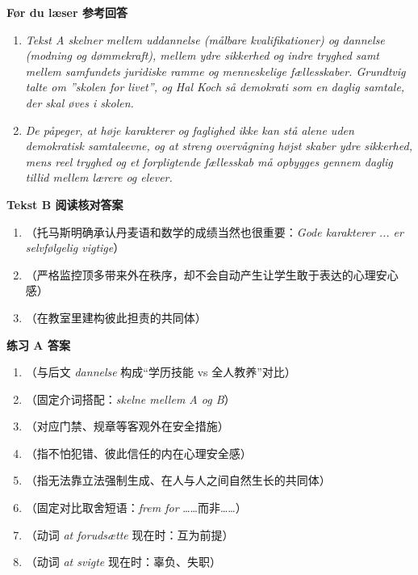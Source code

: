 \begin{answerbox}
\textbf{Før du læser 参考回答}
\begin{enumerate}
  \item \textit{Tekst A skelner mellem uddannelse (målbare kvalifikationer) og dannelse (modning og dømmekraft), mellem ydre sikkerhed og indre tryghed samt mellem samfundets juridiske ramme og menneskelige fællesskaber. Grundtvig talte om ”skolen for livet”, og Hal Koch så demokrati som en daglig samtale, der skal øves i skolen.}
  \item \textit{De påpeger, at høje karakterer og faglighed ikke kan stå alene uden demokratisk samtaleevne, og at streng overvågning højst skaber ydre sikkerhed, mens reel tryghed og et forpligtende fællesskab må opbygges gennem daglig tillid mellem lærere og elever.}
\end{enumerate}

\textbf{Tekst B 阅读核对答案}
\begin{enumerate}
  \item {}（托马斯明确承认丹麦语和数学的成绩当然也很重要：\textit{Gode karakterer ... er selvfølgelig vigtige}）
  \item {}（严格监控顶多带来外在秩序，却不会自动产生让学生敢于表达的心理安心感）
  \item {}（在教室里建构彼此担责的共同体）
\end{enumerate}

\textbf{练习 A 答案}
\begin{enumerate}
  \item {}（与后文 \textit{dannelse} 构成“学历技能 vs 全人教养”对比）
  \item {}（固定介词搭配：\textit{skelne mellem A og B}）
  \item {}（对应门禁、规章等客观外在安全措施）
  \item {}（指不怕犯错、彼此信任的内在心理安全感）
  \item {}（指无法靠立法强制生成、在人与人之间自然生长的共同体）
  \item {}（固定对比取舍短语：\textit{frem for} ……而非……）
  \item {}（动词 \textit{at forudsætte} 现在时：互为前提）
  \item {}（动词 \textit{at svigte} 现在时：辜负、失职）
\end{enumerate}


\end{answerbox}
